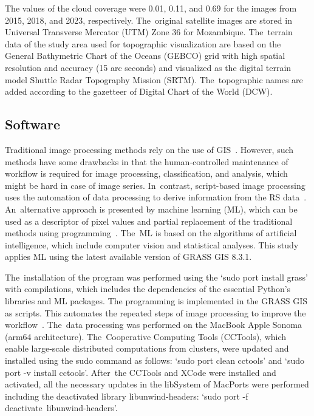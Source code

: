 \documentclass[coasts,article,accept,pdftex,oneauthor]{Definitions/mdpi}
\begin{document}
The {values of the }cloud {coverage were} 0.01, 0.11, and 0.69 for the images from 2015, 2018, and 2023, respectively. The~original satellite images are stored in Universal Transverse Mercator (UTM) Zone 36 for Mozambique. The~terrain data of the study area used for topographic visualization are based on the General Bathymetric Chart of the Oceans (GEBCO) grid with high spatial resolution and accuracy (15 arc seconds) and visualized as the digital terrain model Shuttle Radar Topography Mission (SRTM). The~topographic names are added {according} to the gazetteer of Digital Chart of the World (DCW).  

\subsection{Software}

Traditional image processing methods rely on the use of GIS~\cite{GEMUSSE2023101022,LIANG2023113367,BEY2020111611}. However, such methods have some drawbacks in that{ }the human-controlled maintenance of workflow is required for{ }image{ }processing, classification, and analysis, which might be hard{ }in {case of} {image series}. In~contrast, script-based image processing {uses} the automation of data processing {to derive} information {from the} RS data~\cite{Lemenkova202213}. An~alternative approach is presented by machine learning (ML),{ }which can be used as a  descriptor{ }of pixel values{ }and partial replacement of the traditional methods using programming~\cite{jimaging9050098,Lemenkova202229}. The~ML{ }is based on {the} algorithms of artificial intelligence, which include{ }computer vision and statistical {analyses}. {This} study applies ML{ using} the latest available version of GRASS GIS 8.3.1{.}

{The}~installation of the program was performed using {the} `sudo port install grass' with compilations, {which includes }the{ }dependencies {of} the essential Python's libraries and{ }ML packages. {The }programming is {implemented} in {the }GRASS GIS as scripts{. This automates} the repeated steps of image processing {to improve} the workflow~\cite{technologies11020046,jmse11040871}. The~data processing was performed on the MacBook Apple Sonoma (arm64 {architecture}). The~Cooperative Computing Tools (CCTools), which enable large-scale distributed computations from clusters, were updated and installed using {the }sudo {command} as follows: `sudo port clean cctools' and `sudo port {-v} %
 install cctools'. After~the CCTools and XCode were installed and activated, {all the }necessary updates in the libSystem of MacPorts were performed including the deactivated library libunwind-headers: `sudo port {-f} deactivate~libunwind-headers'. 
\end{document}
